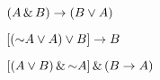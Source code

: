 \begin{earg}
\item $(A \,\&\, B) \rightarrow (B \vee A)$  %





\item $[(\mathord{\sim} A \vee A) \vee B] \rightarrow B$ %



\item $[(A \vee B) \,\&\, \mathord{\sim} A] \,\&\, (B \rightarrow A)$ %
\end{earg}


